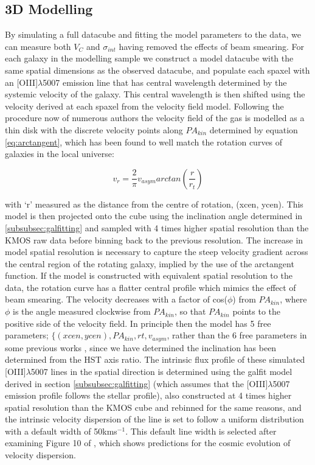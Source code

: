 \documentclass[fleqn,usenatbib]{mn2e}
\begin{document}
\subsection{3D Modelling}\label{subsec:3d modelling}
By simulating a full datacube and fitting the model parameters to the data, we can measure both $V_{C}$ and $\sigma_{int}$ having removed the effects of beam smearing.
For each galaxy in the modelling sample we construct a model datacube with the same spatial dimensions as the observed datacube, and populate each spaxel with an [OIII]$\lambda$5007 emission line that has central wavelength determined by the systemic velocity of the galaxy.
This central wavelength is then shifted using the velocity derived at each spaxel from the velocity field model.  
Following the procedure now of numerous authors \citep[e.g.][]{Epinat2010,Epinat2012,Swinbank2012,Stott2016,Mason2016} the velocity field of the gas is modelled as a thin disk with the discrete velocity points along $PA_{kin}$ determined by equation \ref{eq:arctangent}, which has been found to well match the rotation curves of galaxies in the local universe:

\begin{equation}\label{eq:arctangent}
   v_{r} = \frac{2}{\pi}v_{asym}arctan\left(\frac{r}{r_{t}}\right)
\end{equation}

\noindent
with `r' measured as the distance from the centre of rotation, (xcen, ycen).
This model is then projected onto the cube using the inclination angle determined in \cref{subsubsec:galfitting} and sampled with 4 times higher spatial resolution than the KMOS raw data before binning back to the previous resolution.
The increase in model spatial resolution is necessary to capture the steep velocity gradient across the central region of the rotating galaxy, implied by the use of the arctangent function.
If the model is constructed with equivalent spatial resolution to the data, the rotation curve has a flatter central profile which mimics the effect of beam smearing.
The velocity decreases with a factor of cos($\phi$) from $PA_{kin}$, where $\phi$ is the angle measured clockwise from $PA_{kin}$, so that $PA_{kin}$ points to the positive side of the velocity field.
In principle then the model has 5 free parameters; $\{(xcen, ycen), PA_{kin}, rt, v_{asym}$, rather than the 6 free parameters in some previous works \citep[e.g.][]{Stott2016}, since we have determined the inclination has been determined from the HST axis ratio.
The intrinsic flux profile of these simulated [OIII]$\lambda$5007 lines in the spatial direction is determined using the galfit model derived in section \cref{subsubsec:galfitting} (which assumes that the [OIII]$\lambda$5007 emission profile follows the stellar profile), also constructed at 4 times higher spatial resolution than the KMOS cube and rebinned for the same reasons, and the intrinsic velocity dispersion of the line is set to follow a uniform distribution with a default width of 50kms$^{-1}$.
This default line width is selected after examining Figure 10 of \cite{Wisnioski2015}, which shows predictions for the cosmic evolution of velocity dispersion.
\end{document}
